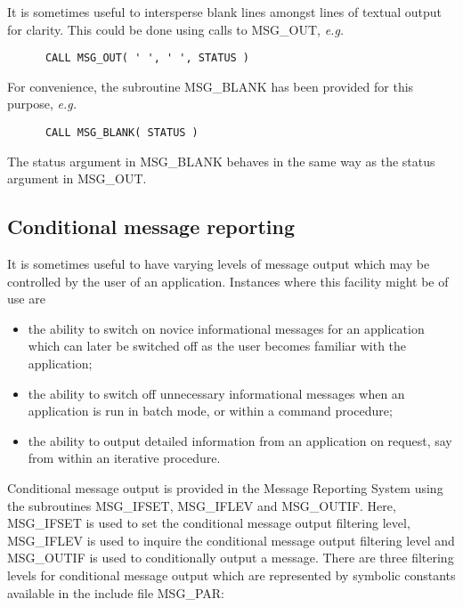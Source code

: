 It is sometimes useful to intersperse blank lines amongst lines of textual
output for clarity.
This could be done using calls to MSG\_OUT, {\em e.g.}

\begin {small}
\begin{verbatim}
      CALL MSG_OUT( ' ', ' ', STATUS )
\end{verbatim}
\end {small}

For convenience, the subroutine MSG\_BLANK has been provided for this 
purpose, {\em e.g.}

\begin {small}
\begin{verbatim}
      CALL MSG_BLANK( STATUS )
\end{verbatim}
\end {small}

The status argument in MSG\_BLANK behaves in the same way as the status 
argument in MSG\_OUT.


\subsection {Conditional message reporting}

It is sometimes useful to have varying levels of message output which 
may be controlled by the user of an application.
Instances where this facility might be of use are

\begin {itemize}
\item the ability to switch on novice informational messages for an 
application which can later be switched off as the user becomes familiar with 
the application;
\item the ability to switch off unnecessary informational messages when
an application is run in batch mode, or within a command procedure;
\item the ability to output detailed information from an application on 
request, say from within an iterative procedure.
\end {itemize}

\begin {sloppypar}
Conditional message output is provided in the Message Reporting System
using the subroutines MSG\_IFSET, MSG\_IFLEV and MSG\_OUTIF.
Here, MSG\_IFSET is used to set the conditional message output filtering level,
MSG\_IFLEV is used to inquire the conditional message output filtering
level and MSG\_OUTIF is used to conditionally output a message.
There are three filtering levels for conditional message output which are 
represented by symbolic constants available in the include file MSG\_PAR:
\end {sloppypar}

